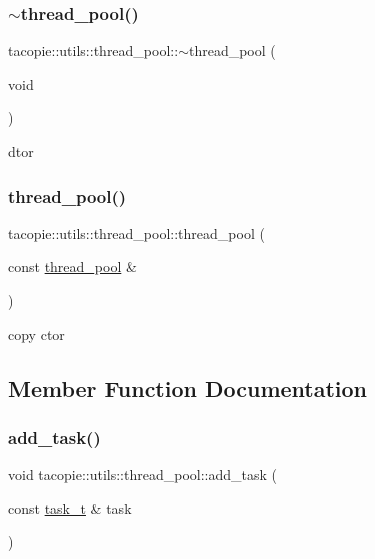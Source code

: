 \subsubsection{\texorpdfstring{$\sim$thread\+\_\+pool()}{~thread\_pool()}}
{\footnotesize\ttfamily tacopie\+::utils\+::thread\+\_\+pool\+::$\sim$thread\+\_\+pool (\begin{DoxyParamCaption}\item[{void}]{ }\end{DoxyParamCaption})}



dtor 

\mbox{\label{classtacopie_1_1utils_1_1thread__pool_a63a850c39d21058eda9d655bb7eff452}} 
\subsubsection{\texorpdfstring{thread\+\_\+pool()}{thread\_pool()}\hspace{0.1cm}{\footnotesize\ttfamily [2/2]}}
{\footnotesize\ttfamily tacopie\+::utils\+::thread\+\_\+pool\+::thread\+\_\+pool (\begin{DoxyParamCaption}\item[{const \hyperlink{classtacopie_1_1utils_1_1thread__pool}{thread\+\_\+pool} \&}]{ }\end{DoxyParamCaption})\hspace{0.3cm}{\ttfamily [delete]}}



copy ctor 



\subsection{Member Function Documentation}
\mbox{\label{classtacopie_1_1utils_1_1thread__pool_a450bee2b7b2cd0aa0bc3935c8adc9ace}} 
\subsubsection{\texorpdfstring{add\+\_\+task()}{add\_task()}}
{\footnotesize\ttfamily void tacopie\+::utils\+::thread\+\_\+pool\+::add\+\_\+task (\begin{DoxyParamCaption}\item[{const \hyperlink{classtacopie_1_1utils_1_1thread__pool_a8ae8886fdeaa8e5c0abad12626a47296}{task\+\_\+t} \&}]{task }\end{DoxyParamCaption})}


